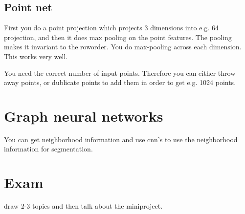 \documentclass[a4paper]{article}
\begin{document}
\subsection{Point net}
First you do a point projection which projects 3 dimensions into e.g. 64 projection, and then it does max pooling on the point features. The pooling makes it invariant to the roworder. You do max-pooling across each dimension. This works very well. 

You need the correct number of input points. Therefore you can either throw away points, or dublicate points to add them in order to get e.g. 1024 points. 

\section{Graph neural networks}
You can get neighborhood information and use cnn's to use the neighborhood information for segmentation.

\section{Exam}
draw 2-3 topics and then talk about the miniproject.
\end{document}
